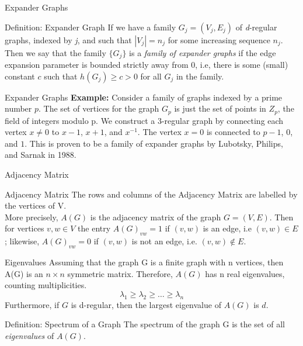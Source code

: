 \documentclass[10pt]{beamer}
\begin{document}
\begin{frame}[t]{Expander Graphs}
    \vspace{5em}
    \begin{block}{Definition: Expander Graph}
        If we have a family $G_j = (V_j, E_j)$ of \textit{d}-regular graphs, indexed by \textit{j}, and such that $|V_j|=n_j$ for some increasing sequence $n_j$. Then we say that the family $\{G_j\}$ is a \textit{family of expander graphs} if the edge expansion parameter is bounded strictly away from 0, i.e, there is some (small) constant $c$ such that $h(G_j) \geq c > 0$ for all $G_j$ in the family.
    \end{block}
\end{frame}

\begin{frame}[t]{Expander Graphs}
    \textbf{Example:} Consider a family of graphs indexed by a prime number $p$. The set of vertices for the graph $G_p$ is just the set of points in $Z_p$, the field of integers modulo p. 
    \pause{}
    We construct a 3-regular graph by connecting each vertex $x \neq 0$ to $x-1$, $x+1$, and $x^{-1}$.
    \pause{}
    The vertex $x=0$ is connected to $p-1$, $0$, and $1$.
    \pause{}
    This is proven to be a family of expander graphs by Lubotsky, Philips, and Sarnak in 1988.
\end{frame}

\begin{frame}{Adjacency Matrix}
    \vspace{3em}
    \begin{block}{Adjacency Matrix}
        The rows and columns of the Adjacency Matrix are labelled by the vertices of V.\\
        More precisely, $A(G)$ is the adjacency matrix of the graph $G=(V, E)$. Then for vertices $v,w \in V$ the entry $A(G)_{vw} = 1$ if $(v,w)$ is an edge, i.e $(v,w) \in E$; likewise, $A(G)_{vw} = 0$ if $(v,w)$ is not an edge, i.e. $(v,w) \not \in E$.
    \end{block}
    \end{frame}

\begin{frame}[t]{Eigenvalues}
    \vspace{2em}
    Assuming that the graph G is a finite graph with n vertices, then A(G) is an $n \times n$ symmetric  matrix.
    \pause{}
    Therefore, $A(G)$ has n real eigenvalues, counting multiplicities.
    \pause{}
    $$\lambda_1 \geq \lambda_2 \geq \ldots \geq \lambda_n$$
    \pause{}
    Furthermore, if $G$ is d-regular, then the largest eigenvalue of $A(G)$ is $d$.
    \pause{}
    \vspace{3em}
    \begin{block}{Definition: Spectrum of a  Graph}
        The spectrum of the graph G is the set of all \textit{eigenvalues} of $A(G)$.
    \end{block}
\end{frame}
\end{document}
